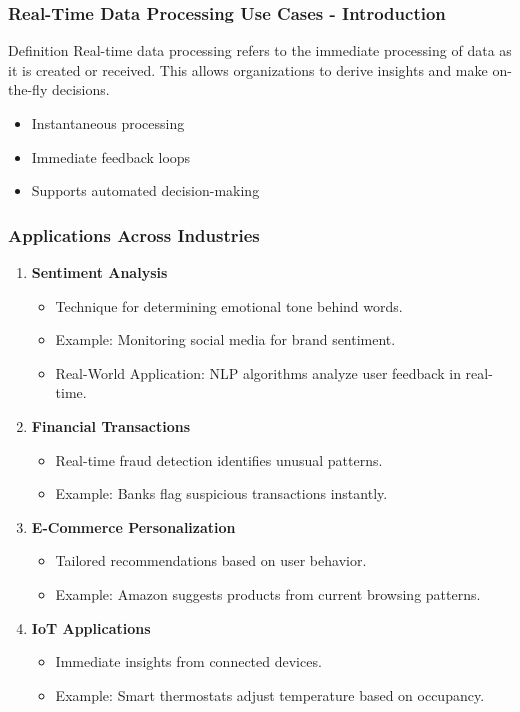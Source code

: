 \documentclass[aspectratio=169]{beamer}
\begin{document}
\begin{frame}[fragile]
    \frametitle{Real-Time Data Processing Use Cases - Introduction}
    \begin{block}{Definition}
        Real-time data processing refers to the immediate processing of data as it is created or received. This allows organizations to derive insights and make on-the-fly decisions.
    \end{block}
    
    \begin{itemize}
        \item Instantaneous processing
        \item Immediate feedback loops
        \item Supports automated decision-making
    \end{itemize}
\end{frame}

\begin{frame}[fragile]
    \frametitle{Applications Across Industries}
    \begin{enumerate}
        \item \textbf{Sentiment Analysis}
            \begin{itemize}
                \item Technique for determining emotional tone behind words.
                \item Example: Monitoring social media for brand sentiment.
                \item Real-World Application: NLP algorithms analyze user feedback in real-time.
            \end{itemize}
        \item \textbf{Financial Transactions}
            \begin{itemize}
                \item Real-time fraud detection identifies unusual patterns.
                \item Example: Banks flag suspicious transactions instantly.
            \end{itemize}
        \item \textbf{E-Commerce Personalization}
            \begin{itemize}
                \item Tailored recommendations based on user behavior.
                \item Example: Amazon suggests products from current browsing patterns.
            \end{itemize}
        \item \textbf{IoT Applications}
            \begin{itemize}
                \item Immediate insights from connected devices.
                \item Example: Smart thermostats adjust temperature based on occupancy.
            \end{itemize}
    \end{enumerate}
\end{frame}
\end{document}
